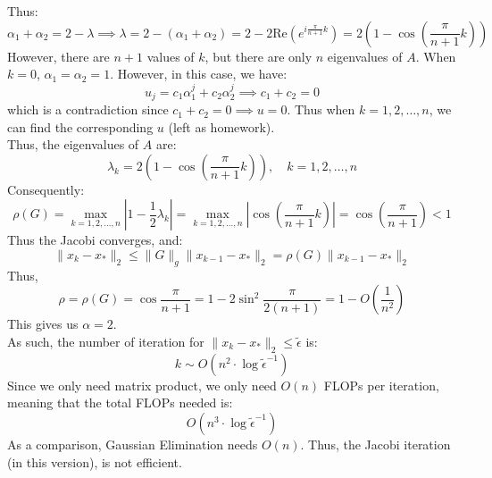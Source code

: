 \documentclass[../main/main.tex]{subfiles}
\begin{document}
Thus: \[
  \alpha_{1} +\alpha_{2} = 2-\lambda \implies \lambda = 2-(\alpha_{1}+\alpha_{2}) = 2-2\text{Re}(e^{i \frac{\pi}{n+1}k}) = 2(1-\cos\left( \frac{\pi}{n+1}k \right))
\]
However, there are $n+1$ values of $k$, but there are only $n$ eigenvalues of $A$. When $k=0$, $\alpha_{1}=\alpha_{2}=1$. However, in this case, we have: \[
  u_{j}=c_{1}\alpha_{1}^{j}+c_{2}\alpha_{2}^{j} \implies c_1+c_2=0
\] which is a contradiction since $c_1+c_2=0 \implies u = 0$.  Thus when $k=1,2, \ldots,n$, we can find the corresponding $u$ (left as homework).\\

Thus, the eigenvalues of $A$ are: \[
  \lambda_{k} = 2(1-\cos\left(\frac{\pi}{n+1}k\right)), \quad k = 1,2, \ldots , n
\] Consequently: \[
  \rho(G) = \max_{k=1,2, \ldots, n} |1- \frac{1}{2}\lambda_{k}| = \max_{k=1,2, \ldots , n} |\cos\left(\frac{\pi}{n+1}k\right)| = \cos \left( \frac{\pi}{n+1}\right) < 1
\] Thus the Jacobi converges, and: \[
  \|x_{k}-x_{*}\|_{2} \leq \|G\|_{g} \|x_{k-1}- x_{*}\|_{2} = \rho(G) \|x_{k-1}-x_{*}\|_{2}
\] Thus, \[
\rho = \rho(G) = \cos \frac{\pi}{n+1} = 1-2\sin^2 \frac{\pi}{2(n+1)} = 1-O(\frac{1}{n^2})
\] This gives us $\alpha = 2$. \\

As such, the number of iteration for $\|x_{k}-x_{*}\|_{2}\leq \tilde{\epsilon}$ is: \[
  k\sim O(n^2\cdot \log\tilde{\epsilon}^{-1})
\]
Since we only need matrix product, we only need $O(n)$ FLOPs per iteration, meaning that the total FLOPs needed is: \[
O(n^3\cdot \log\tilde{\epsilon}^{-1})
\]
As a comparison, Gaussian Elimination needs $O(n)$. Thus, the Jacobi iteration (in this version), is not efficient.
\end{document}

